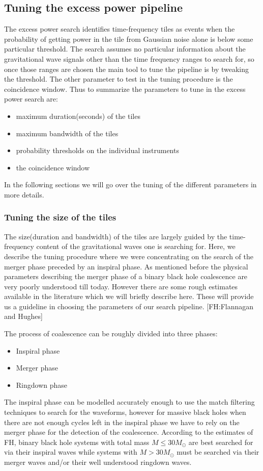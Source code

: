 \clearpage

\subsection{Tuning the excess power pipeline}
\label{section:tuning}

The excess power search identifies time-frequency tiles as events when the 
probability of getting power in the tile from Gaussian noise alone
is below some particular threshold.  The search assumes no particular 
information about the gravitational wave signals other than the time
frequency ranges to search for,  so once those ranges are chosen the main 
tool to tune the pipeline is by tweaking the threshold.  The other parameter 
to test in the tuning procedure is the coincidence window.  Thus to 
summarize the parameters to tune in the excess power search are:
\begin{itemize}
\item maximum duration(seconds) of the tiles
\item maximum bandwidth of the tiles
\item probability thresholds on the individual instruments
\item the coincidence window
\end{itemize}
In the following sections we will go over the tuning of the different 
parameters in more details.

\subsubsection{Tuning the size of the tiles}
\label{section:tunetilesize}

The size(duration and bandwidth) of the tiles are largely guided by the
time-frequency content of the gravitational waves one is searching for.
  Here,  we describe the tuning procedure where we were concentrating 
on the search of the merger phase preceded by an inspiral phase.  As
mentioned before the physical parameters describing the merger phase
of a binary black hole coalescence are very poorly understood till
today.  However there are some rough estimates available in the literature 
which we will briefly describe here.  These will provide us a guideline
in choosing the parameters of our search pipeline. [FH:Flannagan and Hughes]

The process of coalescence can be roughly divided into three phases:
\begin{itemize}
\item Inspiral phase
\item Merger phase
\item Ringdown phase
\end{itemize}
The inspiral phase can be modelled accurately enough to use the match
filtering techniques to search for the waveforms, however for massive
black holes when there are not enough cycles left in the inspiral phase 
we have to rely on the merger phase for the detection of the coalescence.
According to the estimates of FH, binary black hole systems with total
mass $M \leq 30M_{\odot}$ are best searched for via their inspiral waves
while systems with $M > 30M_{\odot}$ must be searched via their
merger waves and/or their well understood ringdown waves.  


